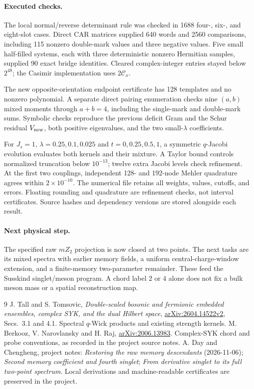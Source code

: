 \documentclass[11pt,a4paper]{article}
\newcommand{\J}{J_s}
\begin{document}
\paragraph{Executed checks.}
The local normal/reverse determinant rule was checked in 1688
four-, six-, and eight-slot cases. Direct CAR matrices supplied
640 words and 2560 comparisons, including 115 nonzero double-mark
values and three negative values. Five small half-filled systems,
each with three deterministic nonzero Hermitian samples, supplied
90 exact bridge identities. Cleared complex-integer entries stayed
below $2^{48}$; the Casimir implementation uses $2\mathcal C_x$.

The new opposite-orientation endpoint certificate has 128 templates
and no nonzero polynomial. A separate direct pairing enumeration
checks nine $(a,b)$ mixed moments through $a+b=4$, including the
single-mark and double-mark sums. Symbolic checks reproduce the
previous deficit Gram and the Schur residual $V_{\rm new}$, both
positive eigenvalues, and the two small-$\lambda$ coefficients.

For $\J=1$, $\lambda=0.25,0.1,0.025$ and
$t=0,0.25,0.5,1$, a symmetric $q$-Jacobi evolution evaluates both
kernels and their mixture. A Taylor bound controls normalized
truncation below $10^{-13}$; twelve extra Jacobi levels check
refinement. At the first two couplings, independent 128- and
192-node Mehler quadrature agrees within $2\times10^{-10}$.
The numerical file retains all weights, values, cutoffs, and errors.
Floating rounding and quadrature are refinement checks, not
interval certificates. Source hashes and dependency versions are
stored alongside each result.

\paragraph{Next physical step.}
The specified raw $mZ_2$ projection is now closed at two points.
The next tasks are its mixed spectra with earlier memory fields,
a uniform central-charge-window extension, and a finite-memory
two-parameter remainder. These feed the Susskind singlet/meson
program. A chord label $2$ or $4$ alone does not fix a bulk meson
mass or a spatial reconstruction map.

\begin{thebibliography}{9}\small
{} J. Tall and S. Tomsovic,
\emph{Double-scaled bosonic and fermionic embedded ensembles,
complex SYK, and the dual Hilbert space},
\href{https://arxiv.org/html/2604.14522v2}{arXiv:2604.14522v2},
Secs.~3.1 and 4.1. Spectral $q$-Wick products and existing strength kernels.
 M. Berkooz, V. Narovlansky and H. Raj,
\href{https://arxiv.org/abs/2006.13983}{arXiv:2006.13983}.
Complex-SYK chord and probe conventions, as recorded in the project source notes.
 A. Day and Chengheng, project notes:
\emph{Restoring the raw memory descendants} (2026-11-06);
\emph{Second memory coefficient and fourth singlet};
\emph{From derivative singlet to its full two-point spectrum}.
Local derivations and machine-readable certificates are preserved in the project.
\end{thebibliography}
\end{document}
